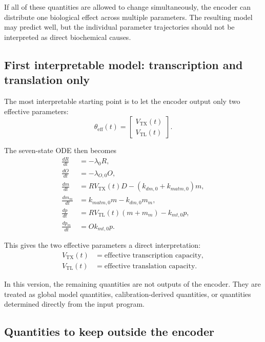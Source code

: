\documentclass[11pt]{article}
\newcommand{\TX}{\mathrm{TX}}
\newcommand{\TL}{\mathrm{TL}}
\begin{document}
If all of these quantities are allowed to change simultaneously, the encoder can distribute one biological effect across multiple parameters. The resulting model may predict well, but the individual parameter trajectories should not be interpreted as direct biochemical causes.

\subsection{First interpretable model: transcription and translation only}

The most interpretable starting point is to let the encoder output only two effective parameters:
\begin{equation}
    \theta_{\mathrm{eff}}(t)=
    \begin{bmatrix}
        V_{\TX}(t)\\
        V_{\TL}(t)
    \end{bmatrix}.
\end{equation}

The seven-state ODE then becomes
\begin{align}
    \frac{dR}{dt} &= -\lambda_0 R, \\
    \frac{dO}{dt} &= -\lambda_{O,0} O, \\
    \frac{dm}{dt} &= R V_{\TX}(t)D-(k_{dm,0}+k_{matm,0})m, \\
    \frac{dm_m}{dt} &= k_{matm,0}m-k_{dm,0}m_m, \\
    \frac{dp}{dt} &= R V_{\TL}(t)(m+m_m)-k_{mt,0}p, \\
    \frac{dp_m}{dt} &= O k_{mt,0}p.
\end{align}

This gives the two effective parameters a direct interpretation:
\begin{align}
    V_{\TX}(t) &= \text{effective transcription capacity}, \\
    V_{\TL}(t) &= \text{effective translation capacity}.
\end{align}

In this version, the remaining quantities are not outputs of the encoder. They are treated as global model quantities, calibration-derived quantities, or quantities determined directly from the input program.

\subsection{Quantities to keep outside the encoder}
\end{document}
